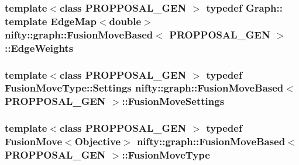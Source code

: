 \subsubsection[{Edge\+Weights}]{\setlength{\rightskip}{0pt plus 5cm}template$<$class P\+R\+O\+P\+P\+O\+S\+A\+L\+\_\+\+G\+E\+N $>$ typedef Graph\+:: template Edge\+Map$<$double$>$ {\bf nifty\+::graph\+::\+Fusion\+Move\+Based}$<$ P\+R\+O\+P\+P\+O\+S\+A\+L\+\_\+\+G\+E\+N $>$\+::{\bf Edge\+Weights}}\label{classnifty_1_1graph_1_1FusionMoveBased_a650e7beea4f78efe543928dd00c1f713}
\hypertarget{classnifty_1_1graph_1_1FusionMoveBased_aae91340fac92d40d69ab7526dd2b12ca}{}
\subsubsection[{Fusion\+Move\+Settings}]{\setlength{\rightskip}{0pt plus 5cm}template$<$class P\+R\+O\+P\+P\+O\+S\+A\+L\+\_\+\+G\+E\+N $>$ typedef {\bf Fusion\+Move\+Type\+::\+Settings} {\bf nifty\+::graph\+::\+Fusion\+Move\+Based}$<$ P\+R\+O\+P\+P\+O\+S\+A\+L\+\_\+\+G\+E\+N $>$\+::{\bf Fusion\+Move\+Settings}}\label{classnifty_1_1graph_1_1FusionMoveBased_aae91340fac92d40d69ab7526dd2b12ca}
\hypertarget{classnifty_1_1graph_1_1FusionMoveBased_a6b569b199cc2677d658972d5bcbf1922}{}
\subsubsection[{Fusion\+Move\+Type}]{\setlength{\rightskip}{0pt plus 5cm}template$<$class P\+R\+O\+P\+P\+O\+S\+A\+L\+\_\+\+G\+E\+N $>$ typedef {\bf Fusion\+Move}$<${\bf Objective}$>$ {\bf nifty\+::graph\+::\+Fusion\+Move\+Based}$<$ P\+R\+O\+P\+P\+O\+S\+A\+L\+\_\+\+G\+E\+N $>$\+::{\bf Fusion\+Move\+Type}}\label{classnifty_1_1graph_1_1FusionMoveBased_a6b569b199cc2677d658972d5bcbf1922}
\hypertarget{classnifty_1_1graph_1_1FusionMoveBased_a205de789ea5e0f76764b89abf2a49b3f}{}
